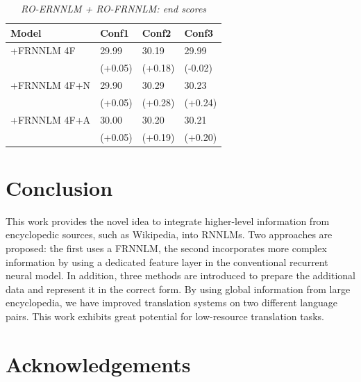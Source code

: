 \documentclass[a4paper]{article}
\begin{document}
\begin{table}
\caption{\it RO-ERNNLM + RO-FRNNLM: end scores}
\vspace{2mm}
\centering
  \begin{tabular}{llll}
  	\hline
  	Model        & Conf1   & Conf2   & Conf3   \\ \hline\hline
  	+FRNNLM 4F   & 29.99   & 30.19   & 29.99   \\
  	             & (+0.05) & (+0.18) & (-0.02) \\
  	+FRNNLM 4F+N & 29.90   & 30.29   & 30.23   \\
  	             & (+0.05) & (+0.28) & (+0.24) \\
  	+FRNNLM 4F+A & 30.00   & 30.20   & 30.21   \\
  	             & (+0.05) & (+0.19) & (+0.20)
  \end{tabular}
  \label{tb:ro-extended}
\end{table}


\section{Conclusion}
This work provides the novel idea to integrate higher-level information from encyclopedic sources, such as Wikipedia, into RNNLMs. Two approaches are proposed: the first uses a FRNNLM, the second incorporates more complex information by using a dedicated feature layer in the conventional recurrent neural model. In addition, three methods are introduced to prepare the additional data and represent it in the correct form.
By using global information from large encyclopedia, we have improved translation systems on two different language pairs.  
This work exhibits great potential for low-resource translation tasks. 



\section{Acknowledgements}
\end{document}
